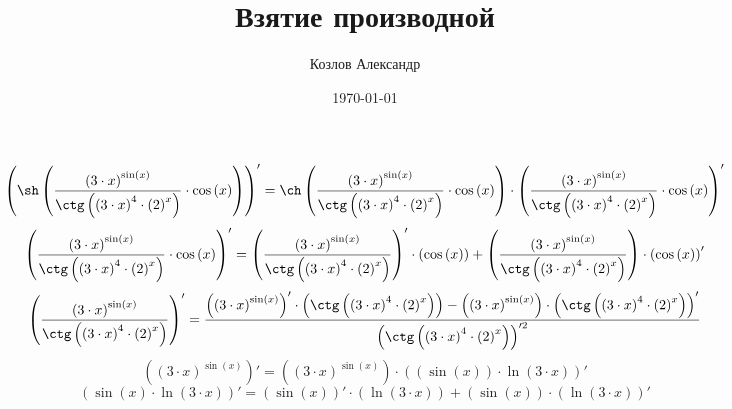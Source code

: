 \documentclass[a4paper,12pt]{article} %
\date{\today}
\title{Взятие производной}
\author{Козлов Александр}
\begin{document}
\maketitle
\section{}
$$  \left(\sh\left(\frac{ \left( 3\cdot x \right) ^{\sin\left(x\right)}}{\ctg\left( \left( 3\cdot x \right) ^{4}\cdot  \left( 2 \right) ^{x}\right)}\cdot \cos\left(x\right)\right) \right)' =  \ch \left( \frac{ \left( 3\cdot x \right) ^{\sin\left(x\right)}}{\ctg\left( \left( 3\cdot x \right) ^{4}\cdot  \left( 2 \right) ^{x}\right)}\cdot \cos\left(x\right) \right)  \cdot  \left(\frac{ \left( 3\cdot x \right) ^{\sin\left(x\right)}}{\ctg\left( \left( 3\cdot x \right) ^{4}\cdot  \left( 2 \right) ^{x}\right)}\cdot \cos\left(x\right) \right)' $$
 \newline$$  \left(\frac{ \left( 3\cdot x \right) ^{\sin\left(x\right)}}{\ctg\left( \left( 3\cdot x \right) ^{4}\cdot  \left( 2 \right) ^{x}\right)}\cdot \cos\left(x\right) \right)' =  \left(\frac{ \left( 3\cdot x \right) ^{\sin\left(x\right)}}{\ctg\left( \left( 3\cdot x \right) ^{4}\cdot  \left( 2 \right) ^{x}\right)} \right)' \cdot  \left(\cos\left(x\right) \right) +  \left(\frac{ \left( 3\cdot x \right) ^{\sin\left(x\right)}}{\ctg\left( \left( 3\cdot x \right) ^{4}\cdot  \left( 2 \right) ^{x}\right)} \right) \cdot  \left(\cos\left(x\right) \right)' $$
 \newline$$  \left(\frac{ \left( 3\cdot x \right) ^{\sin\left(x\right)}}{\ctg\left( \left( 3\cdot x \right) ^{4}\cdot  \left( 2 \right) ^{x}\right)} \right)' = \frac{  \left( \left( 3\cdot x \right) ^{\sin\left(x\right)} \right)' \cdot  \left(\ctg\left( \left( 3\cdot x \right) ^{4}\cdot  \left( 2 \right) ^{x}\right) \right) -  \left( \left( 3\cdot x \right) ^{\sin\left(x\right)} \right) \cdot  \left(\ctg\left( \left( 3\cdot x \right) ^{4}\cdot  \left( 2 \right) ^{x}\right) \right)'}{ \left(\ctg\left( \left( 3\cdot x \right) ^{4}\cdot  \left( 2 \right) ^{x}\right) \right)'^2 } $$
 \newline$$  \left( \left( 3\cdot x \right) ^{\sin\left(x\right)} \right)' =  \left( \left( 3\cdot x \right) ^{\sin\left(x\right)} \right) \cdot \left( \left(\sin\left(x\right) \right) \cdot \ln  \left(3\cdot x \right) \right)'  $$
 \newline$$  \left(\sin\left(x\right)\cdot \ln\left(3\cdot x\right) \right)' =  \left(\sin\left(x\right) \right)' \cdot  \left(\ln\left(3\cdot x\right) \right) +  \left(\sin\left(x\right) \right) \cdot  \left(\ln\left(3\cdot x\right) \right)' $$
\end{document}

